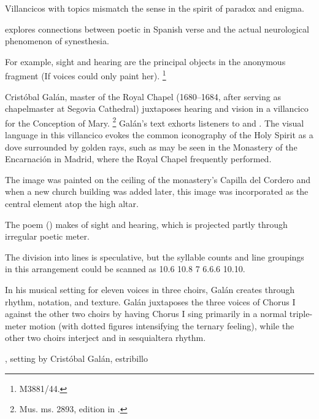 Villancicos with  topics mismatch the sense in the spirit of paradox and enigma.%
\begin{Footnote}
    \Autocite{DoetschKraus:Sinestesia} explores connections between poetic  in Spanish verse and the actual neurological phenomenon of synesthesia.
\end{Footnote}
For example, sight and hearing are the principal objects in the anonymous fragment  (If voices could only paint her).%
\footnote{\signature{E-Mn}{M3881/44}.}

Cristóbal Galán, master of the Royal Chapel (1680--1684, after serving as chapelmaster at Segovia Cathedral) juxtaposes hearing and vision in a villancico for the Conception of Mary.%
\footnote{\signature{D-Mbs}{Mus. ms. 2893}, edition in \autocite[567--568]{CaberoPueyo:PhD}.}
Galán's text exhorts listeners to  and .
The visual language in this villancico evokes the common iconography of the Holy Spirit as a dove surrounded by golden rays, such as may be seen in the Monastery of the Encarnación in Madrid, where the Royal Chapel frequently performed.%
\begin{Footnote}
    The image was painted on the ceiling of the monastery's Capilla del Cordero and when a new church building was added later, this image was incorporated as the central element atop the high altar.%
    \Autocite[69--70, 81]{Sanz:GuiaDescalzasEncarnacion}
\end{Footnote}

The poem () makes  of sight and hearing, which is projected partly through irregular poetic meter.%
\begin{Footnote}
    The division into lines is speculative, but the syllable counts and line groupings in this arrangement could be scanned as 10.6 10.8 7 6.6.6 10.10.
\end{Footnote}
In his musical setting for eleven voices in three choirs, Galán creates  through rhythm, notation, and texture.
Galán juxtaposes the three voices of Chorus I against the other two choirs by having Chorus I sing primarily in a normal triple-meter motion (with dotted figures intensifying the ternary feeling), while the other two choirs interject  and  in sesquialtera rhythm.

\begin{expoem}
    \caption{, setting by Cristóbal Galán, estribillo}
    \label{expoem:Oigan_todos_del_ave-Galan}
\end{expoem}

